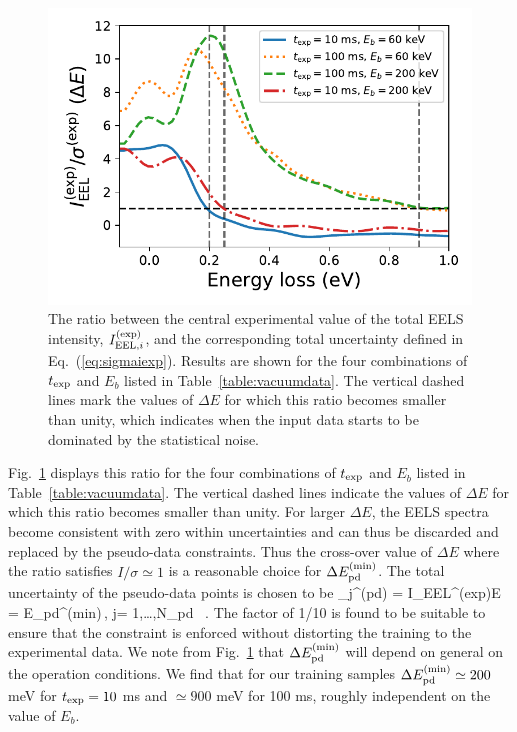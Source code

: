       
\begin{figure}[H]
    \centering
    \includegraphics[width=120mm]{plots/intensity_to_error_ratio.pdf}
    \caption{The ratio between the central experimental value of the total
      EELS intensity, $I_{{\rm EEL},i}^{(\rm exp)}$, and the corresponding
      total uncertainty defined in Eq.~(\ref{eq:sigmaiexp}).
      Results are shown for the four combinations of $t_{\rm exp}$
      and $E_{b}$ listed in Table~\ref{table:vacuumdata}.
      The vertical dashed lines mark the values of $\Delta E$ for which
      this ratio becomes smaller than unity, which indicates when the input
      data starts to be dominated by the statistical noise.
      }
    \label{fig:intensityratio}
\end{figure}

Fig.~\ref{fig:intensityratio} displays this ratio
for the four combinations of $t_{\rm exp}$
and $E_{b}$ listed in Table~\ref{table:vacuumdata}.
%
The vertical dashed lines indicate the values of $\Delta E$ for which
this ratio becomes smaller than unity.
%
For larger $\Delta E$, the EELS spectra become
consistent with zero within uncertainties and can thus be discarded and replaced
by the pseudo-data constraints.
%
Thus the cross-over value of $\Delta E$  where the ratio satisfies $I/\sigma\simeq 1$
is a reasonable choice for $\Delta E_{\rm pd}^{\rm (min)}$.
%
The total uncertainty of the pseudo-data points is chosen to be
\be
\sigma_j^{(\rm pd)} = I_{{\rm EEL}}^{\rm (exp)}\lp \Delta E = \Delta E_{\rm pd}^{\rm (min)}\rp \,, \quad 
j= 1,\ldots,N_{\rm pd} \, .
\ee
The factor of 1/10 is found to be suitable to ensure that the constraint
is enforced without distorting
the training to the experimental data.
%
We note from Fig.~\ref{fig:intensityratio} that $\Delta E_{\rm pd}^{\rm (min)}$ will
depend on general on the operation conditions.
%
We find that
for our training samples $\Delta E_{\rm pd}^{\rm (min)} \simeq 200$ meV for $t_{\rm exp}=10$ ms
and $\simeq  900$ meV for 100 ms, roughly independent on the value of $E_b$.

